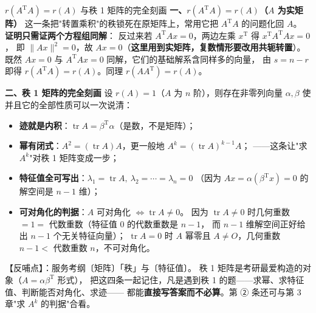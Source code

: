 \begin{fdeep}{$r(A^{\mathrm T}A)=r(A)$ 与秩 1 矩阵的完全刻画}
\textbf{一、$r(A^{\mathrm T}A)=r(A)$（$A$ 为实矩阵）}
这一条把"转置乘积"的秩锁死在原矩阵上，常用它把 $A^{\mathrm T}A$ 的问题化回 $A$。
\textbf{证明只需证两个方程组同解}：
反过来若 $A^{\mathrm T}Ax=0$，两边左乘 $x^{\mathrm T}$ 得 $x^{\mathrm T}A^{\mathrm T}Ax=0$，
即 $\lVert Ax\rVert^{2}=0$，故 $Ax=0$（\textbf{这里用到实矩阵，复数情形要改用共轭转置}）。
既然 $Ax=0$ 与 $A^{\mathrm T}Ax=0$ 同解，它们的基础解系含同样多的向量，
由 $s=n-r$ 即得 $r(A^{\mathrm T}A)=r(A)$。同理 $r(AA^{\mathrm T})=r(A)$。

\textbf{二、秩 1 矩阵的完全刻画}
设 $r(A)=1$（$A$ 为 $n$ 阶），则存在非零列向量 $\alpha,\beta$ 使
并且它的全部性质可以一次说清：
\begin{itemize}[leftmargin=2.2em,itemsep=0.22em]
\item \textbf{迹就是内积}：$\operatorname{tr}A=\beta^{\mathrm T}\alpha$（是数，不是矩阵）；
\item \textbf{幂有闭式}：$A^{2}=(\operatorname{tr}A)A$，更一般地 $A^{k}=(\operatorname{tr}A)^{k-1}A$；
      ——这条让"求 $A^{k}$"对秩 1 矩阵变成一步；
\item \textbf{特征值全可写出}：$\lambda_{1}=\operatorname{tr}A,\ \lambda_{2}=\cdots=\lambda_{n}=0$
      （因为 $Ax=\alpha(\beta^{\mathrm T}x)=0$ 的解空间是 $n-1$ 维）；
\item \textbf{可对角化的判据}：$A$ 可对角化 $\iff \operatorname{tr}A\ne0$。
      因为 $\operatorname{tr}A\ne0$ 时几何重数 $=1=$ 代数重数（特征值 $0$ 的代数重数是 $n-1$，
      而 $n-1$ 维解空间正好给出 $n-1$ 个无关特征向量）；
      $\operatorname{tr}A=0$ 时 $A$ 幂零且 $A\ne O$，几何重数 $n-1<$ 代数重数 $n$，不可对角化。
\end{itemize}
【反哺点】：服务考纲〔矩阵〕「秩」与〔特征值〕。
秩 1 矩阵是考研最爱构造的对象（$A=\alpha\beta^{\mathrm{T}}$ 形式），
把这四条一起记住，凡是遇到秩 1 的题——求幂、求特征值、判断能否对角化、求迹——
都能\textbf{直接写答案而不必算}。第 ② 条还可与第 3 章"求 $A^{k}$ 的判据"合看。
\end{fdeep}
